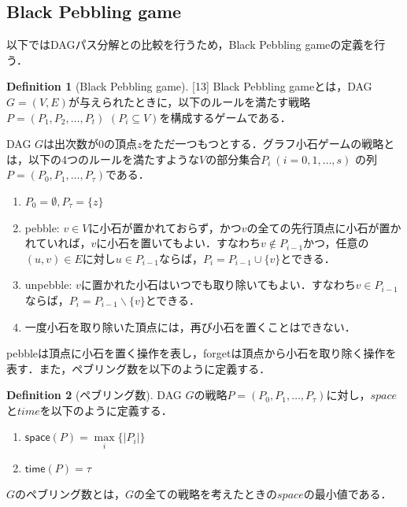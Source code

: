 \documentclass[master]{kuisthesis}		%
\theoremstyle{plain}
\theoremstyle{definition}
\newtheorem{definition*}{Definition}
\begin{document}
\subsection{Black Pebbling game} %
以下ではDAGパス分解との比較を行うため，Black Pebbling gameの定義を行う．

\begin{definition*}[Black Pebbling game][13]
    Black Pebbling gameとは，DAG $G = (V, E)$が与えられたときに，以下のルールを満たす戦略$P=(P_1, P_2, \dots, P_t)$ $(P_i \subseteq V)$を構成するゲームである．


    DAG $G$は出次数が0の頂点$z$をただ一つもつとする．グラフ小石ゲームの戦略とは，以下の4つのルールを満たすような$V$の部分集合$ P_i\ (i = 0, 1,   \dots, s)$ の列 $P = (P_0, P_1,   \dots, P_{\tau})$である．

    \begin{enumerate}
        \item $P_0 = \emptyset, P_{\tau} = \{ z \}$
        \item pebble: $v \in V$に小石が置かれておらず，かつ$v$の全ての先行頂点に小石が置かれていれば，$v$に小石を置いてもよい．すなわち$v \notin P_{i-1}$かつ，任意の$(u, v) \in E$に対し$u \in P_{i-1}$ならば，$P_i = P_{i-1} \cup \{v\}$とできる．
        \item unpebble: $v$に置かれた小石はいつでも取り除いてもよい．すなわち$v \in P_{i-1}$ならば，$P_i = P_{i-1} \backslash \{v\}$とできる．
        \item 一度小石を取り除いた頂点には，再び小石を置くことはできない．
    \end{enumerate}
\end{definition*}

pebbleは頂点に小石を置く操作を表し，forgetは頂点から小石を取り除く操作を表す．また，ペブリング数を以下のように定義する．

\begin{definition*}[ペブリング数]
    DAG $G$の戦略$P = (P_0, P_1,   \dots, P_{\tau})$に対し，$space$と$time$を以下のように定義する．

    \begin{enumerate}
        \item $\mathsf{space}(P) =  \underset{i}{\max} \{ |P_i| \}$
        \item $\mathsf{time}(P) = \tau$
    \end{enumerate}

    $G$のペブリング数とは，$G$の全ての戦略を考えたときの$space$の最小値である．

\end{definition*}
\end{document}
